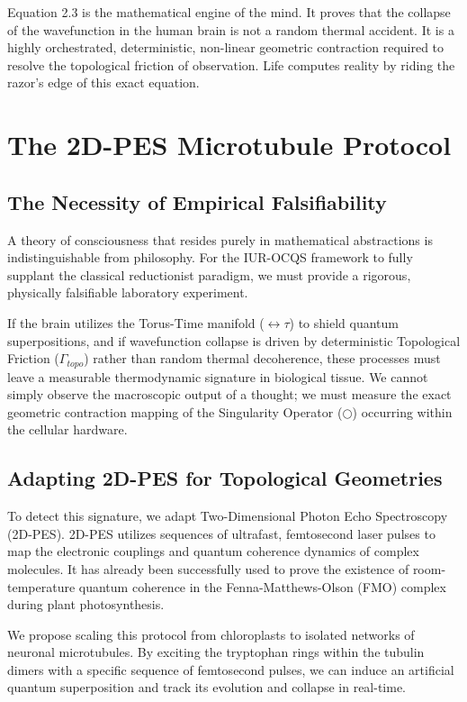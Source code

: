\documentclass[12pt,openany]{book}
\begin{document}
Equation 2.3 is the mathematical engine of the mind. It proves that the collapse of the wavefunction in the human brain is not a random thermal accident. It is a highly orchestrated, deterministic, non-linear geometric contraction required to resolve the topological friction of observation. Life computes reality by riding the razor's edge of this exact equation.

\chapter{The 2D-PES Microtubule Protocol}

\section{The Necessity of Empirical Falsifiability}
A theory of consciousness that resides purely in mathematical abstractions is indistinguishable from philosophy. For the IUR-OCQS framework to fully supplant the classical reductionist paradigm, we must provide a rigorous, physically falsifiable laboratory experiment. 

If the brain utilizes the Torus-Time manifold ($\leftrightarrow\tau$) to shield quantum superpositions, and if wavefunction collapse is driven by deterministic Topological Friction ($\Gamma_{topo}$) rather than random thermal decoherence, these processes must leave a measurable thermodynamic signature in biological tissue. We cannot simply observe the macroscopic output of a thought; we must measure the exact geometric contraction mapping of the Singularity Operator ($\bigcirc$) occurring within the cellular hardware.

\section{Adapting 2D-PES for Topological Geometries}
To detect this signature, we adapt Two-Dimensional Photon Echo Spectroscopy (2D-PES). 2D-PES utilizes sequences of ultrafast, femtosecond laser pulses to map the electronic couplings and quantum coherence dynamics of complex molecules. It has already been successfully used to prove the existence of room-temperature quantum coherence in the Fenna-Matthews-Olson (FMO) complex during plant photosynthesis.

We propose scaling this protocol from chloroplasts to isolated networks of neuronal microtubules. By exciting the tryptophan rings within the tubulin dimers with a specific sequence of femtosecond pulses, we can induce an artificial quantum superposition and track its evolution and collapse in real-time. 
\end{document}
